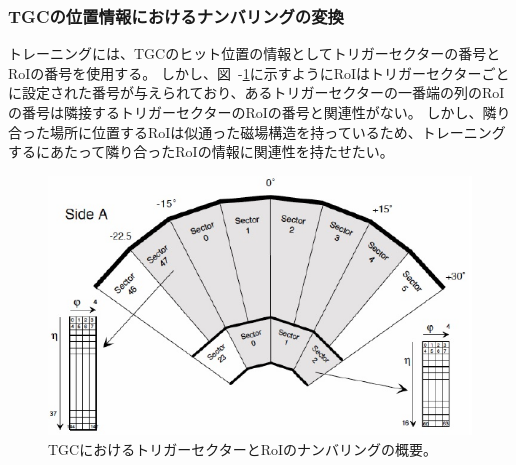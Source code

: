 

\subsubsection{TGCの位置情報におけるナンバリングの変換}
トレーニングには、TGCのヒット位置の情報としてトリガーセクターの番号とRoIの番号を使用する。
しかし、図~-\ref{fig:TGCnumbering}に示すようにRoIはトリガーセクターごとに設定された番号が与えられており、あるトリガーセクターの一番端の列のRoIの番号は隣接するトリガーセクターのRoIの番号と関連性がない。
しかし、隣り合った場所に位置するRoIは似通った磁場構造を持っているため、トレーニングするにあたって隣り合ったRoIの情報に関連性を持たせたい。

\begin{figure}[tb]
  \centering
  \includegraphics[clip, width=12cm]{fig/4/TGC_numbering.pdf}
  \caption{TGCにおけるトリガーセクターとRoIのナンバリングの概要。}
  \label{fig:TGCnumbering}
\end{figure}


